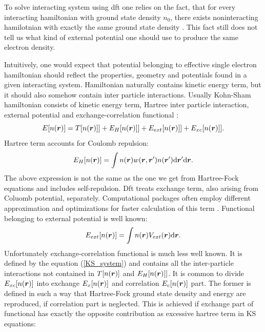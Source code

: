 \documentclass[openany, longbibliography,slovene,a4paper,12pt]{article}
\def\vec#1{\mbox{\boldmath$#1$}}
\newcommand{\dif}{\mathrm{d}}
\begin{document}
To solve interacting system using dft one relies on the fact, that for every
interacting hamiltonian with ground state density $n_0$, there exists
noninteracting hamilotnian with exactly the same ground state density \cite{advanced_course}.
This fact still does not tell us what kind of external potential
one should use to produce the same electron density.

Intuitively, one would expect that potential belonging to effective single
electron hamiltonian should reflect the properties, geometry and potentials found
in a given interacting system. Hamiltonian naturally contains kinetic energy
term, but it should also somehow contain inter particle interactions. Usually
Kohn-Sham hamiltonian consists of kinetic energy term, Hartree inter particle
interaction, external potential and exchange-correlation functional \cite{advanced_course}:
\begin{equation} \label{KS_system}
  E[n(\vec r)]=T[n(\vec r)]] + E_H[n(\vec r)]] + E_{ext}[n(\vec r)]] + E_{xc}[n(\vec r)]].
\end{equation}
Hartree term accounts for Coulomb repulsion:
\begin{equation} \label{hartree_term1}
  E_H[n(\vec r)] = \int n(\vec r)w(\vec r, \vec r') n(\vec r')\dif \vec r' \dif \vec r.
\end{equation}
The above expression is not the same as the one we get from Hartree-Fock
equations and includes self-repulsion. Dft treats exchange term, also arising
from Coluomb potential, separately. Computational packages often employ different
approximation and optimizations for faster calculation of this term \cite{orca}.
Functional belonging to external potential is well known: 
\begin{equation} \label{ext_potential_functional}
  E_{ext}[n(\vec r)] = \int n(\vec r) V_{ext}(\vec r) \dif \vec r.
\end{equation}
Unfortunately exchange-correlation functional is much less well known. It is
defined by the equation (\ref{KS_system}) and contains all the inter-particle
interactions not contained in $T[n(\vec r)]$ and $ E_H[n(\vec r)]]$. It is
common to divide $E_{xc}[n(\vec r)]$ into exchange $E_x[n(\vec r)]$ and
correlation $E_c[n(\vec r)]$ part. The former is defined in such a way that
Hartree-Fock ground state density and energy are reproduced, if correlation part
is neglected. This is achieved if exchange part of functional has exactly the
opposite contribution as excessive hartree term in KS equations: 
\end{document}
